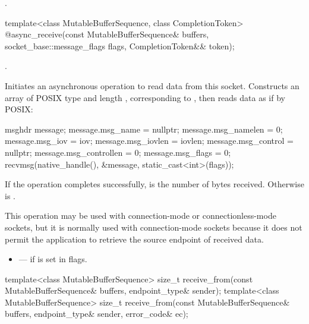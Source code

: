 \begin{itemdescr}
\pnum
\returns {}.
\end{itemdescr}

\begin{itemdecl}
template<class MutableBufferSequence, class CompletionToken>
  @\DEDUCED@ async_receive(const MutableBufferSequence& buffers,
                        socket_base::message_flags flags,
                        CompletionToken&& token);
\end{itemdecl}

\begin{itemdescr}
\pnum
\completionsig {}.

\pnum
\effects Initiates an asynchronous operation to read data from this socket. Constructs an array  of POSIX type  and length , corresponding to , then reads data as if by POSIX: 
\begin{codeblock}
msghdr message;
message.msg_name = nullptr;
message.msg_namelen = 0;
message.msg_iov = iov;
message.msg_iovlen = iovlen;
message.msg_control = nullptr;
message.msg_controllen = 0;
message.msg_flags = 0;
recvmsg(native_handle(), &message, static_cast<int>(flags));
\end{codeblock}


\pnum
If the operation completes successfully,  is the number of bytes received. Otherwise  is .

\pnum
 \enternote This operation may be used with connection-mode or connectionless-mode sockets, but it is normally used with connection-mode sockets because it does not permit the application to retrieve the source endpoint of received data. \exitnote

\pnum
\errors
\begin{itemize}
\item
{} --- if  is set in flags.
\end{itemize}
\end{itemdescr}

\begin{itemdecl}
template<class MutableBufferSequence>
  size_t receive_from(const MutableBufferSequence& buffers,
                      endpoint_type& sender);
template<class MutableBufferSequence>
  size_t receive_from(const MutableBufferSequence& buffers,
                      endpoint_type& sender, error_code& ec);
\end{itemdecl}

